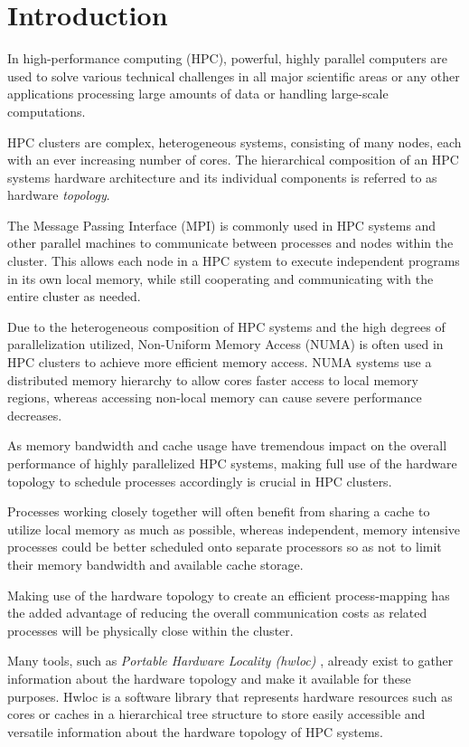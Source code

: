 \chapter{Introduction}\label{chapter:introduction}
In high-performance computing (HPC), powerful, highly parallel computers are used to solve various technical challenges in all major scientific areas or any other applications processing
large amounts of data or handling large-scale computations. \cite{hpc_intro}

HPC clusters are complex, heterogeneous systems, consisting of many nodes, each with an ever increasing number of cores.
The hierarchical composition of an HPC systems hardware architecture and its individual components is referred to as hardware \emph{topology}. \cite{topology_intro}

The Message Passing Interface (MPI) is commonly used in HPC systems and other parallel machines to communicate between processes and nodes within the cluster.
This allows each node in a HPC system to execute independent programs in its own local memory, while still cooperating and communicating with the entire cluster as needed. \cite{mpi_intro}

Due to the heterogeneous composition of HPC systems and the high degrees of parallelization utilized,
Non-Uniform Memory Access (NUMA) is often used in HPC clusters to achieve more efficient memory access.
NUMA systems use a distributed memory hierarchy to allow cores faster access to local memory regions, whereas accessing non-local memory can cause severe performance decreases. \cite{nuioa_intro}

As memory bandwidth and cache usage have tremendous impact on the overall performance of highly parallelized HPC systems,
making full use of the hardware topology to schedule processes accordingly is crucial in HPC clusters. \cite{openmp_intro}

Processes working closely together will often benefit from sharing a cache to utilize local memory as much as possible,
whereas independent, memory intensive processes could be better scheduled onto separate processors so as not to limit their memory bandwidth and available cache storage. \cite{hwloc_paper}

Making use of the hardware topology to create an efficient process-mapping has the added advantage of reducing the overall communication costs as related processes will be physically close within the cluster. \cite{topology_intro}

Many tools, such as \emph{Portable Hardware Locality (hwloc)} \cite{hwloc}, already exist to gather information about the hardware topology and make it available for these purposes.
Hwloc is a software library that represents hardware resources such as cores or caches in a hierarchical tree structure
to store easily accessible and versatile information about the hardware topology of HPC systems. \cite{hwloc_paper}

